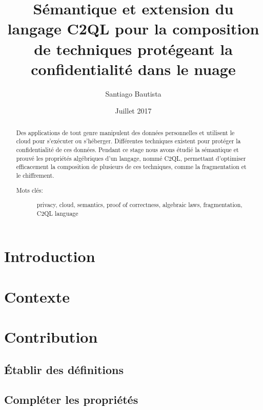 \documentclass[a4paper,11pt]{article}
\author{Santiago Bautista}
\date{Juillet 2017}
\title{Sémantique et extension du langage C2QL pour la composition de techniques protégeant la confidentialité dans le nuage}
\begin{document}
\maketitle
\begin{abstract}
	Des applications de tout genre manipulent des
	données personnelles %
	et utilisent le cloud pour s'exécuter ou s'héberger.
	Différentes techniques existent pour protéger la confidentialité de ces données.
	Pendant ce stage nous avons étudié la sémantique et prouvé les propriétés algébriques d'un langage,
	nommé C2QL, permettant 
	d'optimiser
	efficacement la composition de plusieurs de ces techniques, comme la fragmentation et le chiffrement.
	\begin{description}
		\item[Mots clés:]{\begin{otherlanguage}{english}
				privacy, cloud, semantics, proof of correctness, algebraic laws, fragmentation, C2QL language 
			\end{otherlanguage}} 
	\end{description} 
	
\end{abstract}

\tableofcontents
\pagebreak

\section{Introduction}


\section{Contexte}
\label{context}


\section{Contribution}
\label{contrib}


\subsection{Établir des définitions}
\label{defs}


\subsection{Compléter les propriétés}
\label{compl}

\end{document}
